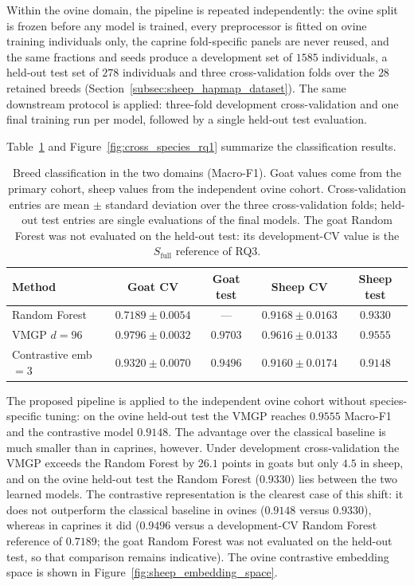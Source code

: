 Within the ovine domain, the pipeline is repeated independently: the
ovine split is frozen before any model is trained, every preprocessor
is fitted on ovine training individuals only, the caprine fold-specific
panels are never reused, and the same fractions and seeds produce a
development set of $1585$ individuals, a held-out test set of $278$
individuals and three cross-validation folds over the $28$ retained breeds
(Section~\ref{subsec:sheep_hapmap_dataset}). The same downstream
protocol is applied: three-fold development cross-validation and one
final training run per model, followed by a single held-out test
evaluation.

Table~\ref{tab:cross_species_rq1} and
Figure~\ref{fig:cross_species_rq1} summarize the classification
results.

\begin{table}[ht]
\centering
\caption{Breed classification in the two domains (Macro-F1). Goat
values come from the primary cohort, sheep values from the independent
ovine cohort. Cross-validation entries are mean $\pm$ standard
deviation over the three cross-validation folds; held-out test entries are
single evaluations of the final models. The goat Random Forest was not
evaluated on the held-out test: its development-CV value is the
$S_{\mathrm{full}}$ reference of RQ3.}
\label{tab:cross_species_rq1}
\begin{tabular}{lcccc}
\hline
Method & Goat CV & Goat test & Sheep CV & Sheep test \\
\hline
Random Forest & $0.7189 \pm 0.0054$ & --- & $0.9168 \pm 0.0163$ & $0.9330$ \\
VMGP $d=96$ & $0.9796 \pm 0.0032$ & $0.9703$ & $0.9616 \pm 0.0133$ & $0.9555$ \\
Contrastive emb$=3$ & $0.9320 \pm 0.0070$ & $0.9496$ & $0.9160 \pm 0.0174$ & $0.9148$ \\
\hline
\end{tabular}
\end{table}

The proposed pipeline is applied to the independent ovine cohort
without species-specific tuning: on the ovine held-out test the VMGP
reaches $0.9555$ Macro-F1 and the contrastive model $0.9148$. The advantage
over the classical baseline is much smaller than in caprines, however.
Under development cross-validation the VMGP exceeds the Random Forest
by $26.1$ points in goats but only $4.5$ in sheep, and on the ovine
held-out test the Random Forest ($0.9330$) lies between the two learned
models. The contrastive representation is the clearest case of this
shift: it does not outperform the classical baseline in ovines
($0.9148$ versus $0.9330$), whereas in caprines it did ($0.9496$
versus a development-CV Random Forest reference of $0.7189$; the goat
Random Forest was not evaluated on the held-out test, so that
comparison remains indicative). The ovine contrastive embedding space is
shown in Figure~\ref{fig:sheep_embedding_space}.

